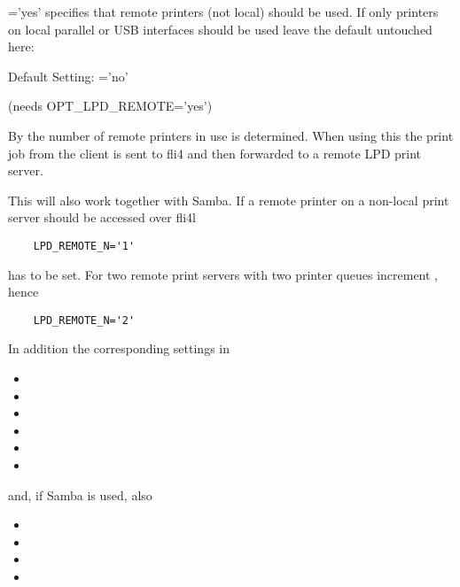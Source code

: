 \begin{description}
  ='yes' specifies that remote printers
  (not local) should be used. If only printers on local parallel or USB
  interfaces should be used leave the default untouched here:

  Default Setting: ='no'


 (needs OPT\_LPD\_REMOTE='yes')

  By  the number of remote printers in use
  is determined. When using this the print job from the client is sent to fli4
  and then forwarded to a remote LPD print server.

  This will also work together with Samba. If a remote printer on a non-local
  print server should be accessed over fli4l

\begin{example}
\begin{verbatim}
    LPD_REMOTE_N='1'
\end{verbatim}
\end{example}

  has to be set. For two remote print servers with two printer queues
  increment , hence

\begin{example}
\begin{verbatim}
    LPD_REMOTE_N='2'
\end{verbatim}
\end{example}

  In addition the corresponding settings in

\begin{itemize}
\item {}
\item {}
\item {}
\item {}
\item {}
\item {}
\end{itemize}

  and, if Samba is used, also

\begin{itemize}
\item {}
\item {}
\item {}
\item {}
\end{itemize}


\end{description}
